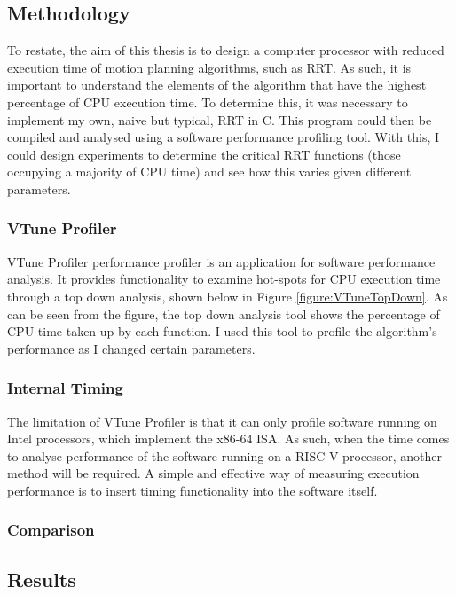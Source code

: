 

\subsection{Methodology}
    To restate, the aim of this thesis is to design a computer processor with reduced execution time of motion planning algorithms, such as \ac{RRT}. As such, it is important to understand the elements of the algorithm that have the highest percentage of CPU execution time. To determine this, it was necessary to implement my own, naive but typical, \ac{RRT} in C. This program could then be compiled and analysed using a software performance profiling tool. With this, I could design experiments to determine the critical RRT functions (those occupying a majority of CPU time) and see how this varies given different parameters.

    \subsubsection{VTune Profiler}
    \label{subsubsection:vtune}
        VTune Profiler performance profiler is an application for software performance analysis. It provides functionality to examine hot-spots for CPU execution time through a top down analysis, shown below in Figure \ref{figure:VTuneTopDown}. As can be seen from the figure, the top down analysis tool shows the percentage of CPU time taken up by each function. I used this tool to profile the algorithm's performance as I changed certain parameters.
        

    \subsubsection{Internal Timing}
        The limitation of VTune Profiler is that it can only profile software running on Intel processors, which implement the x86-64 \ac{ISA}. As such, when the time comes to analyse performance of the software running on a RISC-V processor, another method will be required. A simple and effective way of measuring execution performance is to insert timing functionality into the software itself. 

    \subsubsection{Comparison}

\subsection{Results}
\label{section:rrt_analysis_results}